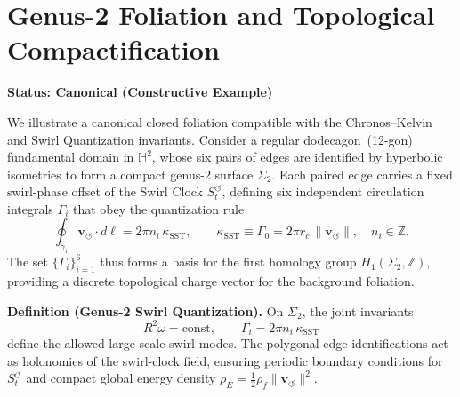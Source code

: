 \documentclass[10pt,reprint,aps,onecolumn,nofootinbib]{revtex4-2}
\begin{document}
    \section{Genus-2 Foliation and Topological Compactification}

    \textbf{Status: Canonical (Constructive Example)}

    \noindent
    We illustrate a canonical closed foliation compatible with the Chronos–Kelvin and Swirl Quantization
    invariants.  Consider a regular dodecagon~(12-gon) fundamental domain in $\mathbb H^2$, whose
    six pairs of edges are identified by hyperbolic isometries to form a compact genus-2 surface
    $\Sigma_2$.  Each paired edge carries a fixed swirl-phase offset of the Swirl Clock
    $S_t^{\boldsymbol{\circlearrowleft}}$, defining six independent circulation integrals
    $\Gamma_i$ that obey the quantization rule
    \begin{equation}
    \oint_{\gamma_i}\mathbf v_{\!\boldsymbol{\circlearrowleft}}\!\cdot d\boldsymbol\ell
    = 2\pi n_i\,\kappa_{\text{SST}},\qquad
    \kappa_{\text{SST}} \equiv \Gamma_0 = 2\pi r_c\,\lVert \mathbf{v}_{\!\boldsymbol{\circlearrowleft}}\rVert,
    \quad n_i\in\mathbb Z .
    \end{equation}
    The set $\{\Gamma_i\}_{i=1}^{6}$ thus forms a basis for the first homology group
    $H_1(\Sigma_2,\mathbb Z)$, providing a discrete topological charge vector for the
    background foliation.

    \vspace{0.5em}
    \noindent
    \textbf{Definition (Genus-2 Swirl Quantization).}
    On $\Sigma_2$, the joint invariants
    \begin{equation}
    R^2\omega = \mathrm{const},
    \qquad
    \Gamma_i = 2\pi n_i\,\kappa_{\text{SST}}
    \end{equation}
    define the allowed large-scale swirl modes.  The polygonal edge identifications act as
    holonomies of the swirl-clock field, ensuring periodic boundary conditions for
    $S_t^{\boldsymbol{\circlearrowleft}}$ and compact global energy density
    $\rho_{\!E}=\tfrac{1}{2}\rho_{\!f}\lVert\mathbf v_{\!\boldsymbol{\circlearrowleft}}\rVert^2$.
\end{document}

